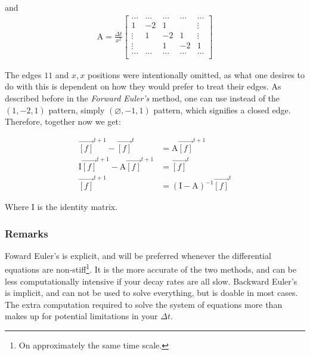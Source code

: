 \documentclass[12pt]{amsart}
\begin{document}
and 
\begin{align}
\mathrm{A} = \frac{\Delta t}{x^2}
\begin{bmatrix} %
\dots       &   \dots       & \dots     &   \dots    &   \dots   \\
1           &   -2          & 1         &            &   \vdots    \\
\vdots      &   1           & -2        &   1        &   \vdots   \\   
\vdots      &               & 1         &   -2       &   1    \\
\dots       &   \dots       & \dots     &   \dots    &   \dots    \\
\end{bmatrix}
\end{align}

The edges $11$ and $x,x$ positions were intentionally omitted, as what one desires to do with this is dependent on how they would prefer to treat their edges. As described before in the \textit{Forward Euler's} method, one can use instead of the $(1,-2,1)$ pattern, simply $(\varnothing,-1,1)$ pattern, which signifies a closed edge. Therefore, together now we get: 

\begin{equation} \label{eq8}
\begin{split}
\vec{[f]}^{t+1} - \vec{[f]}^{t} & = \mathrm{A} \vec{[f]}^{t+1} \\
\mathrm{I}\vec{[f]}^{t+1} - \mathrm{A}\vec{[f]}^{t+1} & = \vec{[f]}^{t} \\
\vec{[f]}^{t+1} & = (\mathrm{I} - \mathrm{A})^{-1}\vec{[f]}^{t}
\end{split}
\end{equation}

Where I is the identity matrix. 

\subsubsection{Remarks} Foward Euler's is explicit, and will be preferred whenever the differential equations are non-stiff\footnote{On approximately the same time scale.}. It is the more accurate of the two methods, and can be less computationally intensive if your decay rates are all slow. Backward Euler's is implicit, and can not be used to solve everything, but is doable in most cases. The extra computation required to solve the system of equations more than makes up for potential limitations in your $\Delta t$. 
\end{document}
